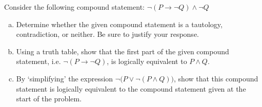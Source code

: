 \documentclass[11pt,letterpaper]{article}
\begin{document}
\newpage



 Consider the following compound statement: $\neg (P \to \neg Q) \wedge \neg Q$
	\begin{enumerate}[(a)]
	\item Determine whether the given compound statement is a tautology, contradiction, or neither. Be sure to justify your response. 
	\item Using a truth table, show that the first part of the given compound statement, i.e. $\neg (P \to \neg Q)$, is logically equivalent to $P \wedge Q$. 
	\item By `simplifying' the expression $\neg \big(P \vee \neg (P \wedge Q) \big)$, show that this compound statement is logically equivalent to the compound statement given at the start of the problem.
	\end{enumerate} \pspace
\end{document}
